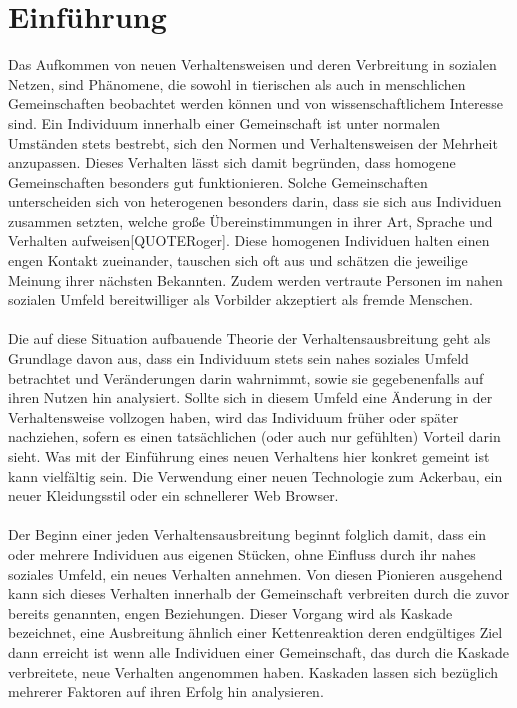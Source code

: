 \documentclass[12pt]{article}
\begin{document}
\section{Einführung}
Das Aufkommen von neuen Verhaltensweisen und deren Verbreitung in sozialen Netzen, sind Phänomene, die sowohl in tierischen als auch in menschlichen Gemeinschaften beobachtet werden können und von wissenschaftlichem Interesse sind. Ein Individuum innerhalb einer Gemeinschaft ist unter normalen Umständen stets bestrebt, sich den Normen und Verhaltensweisen der Mehrheit anzupassen. Dieses Verhalten lässt sich damit begründen, dass homogene Gemeinschaften besonders gut funktionieren. Solche Gemeinschaften unterscheiden sich von heterogenen besonders darin, dass sie sich aus Individuen zusammen setzten, welche große Übereinstimmungen in ihrer Art, Sprache und Verhalten aufweisen[QUOTERoger]. Diese homogenen Individuen halten einen engen Kontakt zueinander, tauschen sich oft aus und schätzen die jeweilige Meinung ihrer nächsten Bekannten. Zudem werden vertraute Personen im nahen sozialen Umfeld bereitwilliger als Vorbilder akzeptiert als fremde Menschen.\\\\
Die auf diese Situation aufbauende Theorie der Verhaltensausbreitung geht als Grundlage davon aus, dass ein Individuum stets sein nahes soziales Umfeld betrachtet und Veränderungen darin wahrnimmt, sowie sie gegebenenfalls auf ihren Nutzen hin analysiert. Sollte sich in diesem Umfeld eine Änderung in der Verhaltensweise vollzogen haben, wird das Individuum früher oder später nachziehen, sofern es einen tatsächlichen (oder auch nur gefühlten) Vorteil darin sieht. Was mit der Einführung eines neuen Verhaltens hier konkret gemeint ist kann vielfältig sein. Die Verwendung einer neuen Technologie zum Ackerbau, ein neuer Kleidungsstil oder ein schnellerer Web Browser.\\\\
Der Beginn einer jeden Verhaltensausbreitung beginnt folglich damit, dass ein oder mehrere Individuen aus eigenen Stücken, ohne Einfluss durch ihr nahes soziales Umfeld, ein neues Verhalten annehmen. Von diesen Pionieren ausgehend kann sich dieses Verhalten innerhalb der Gemeinschaft verbreiten durch die zuvor bereits genannten, engen Beziehungen. Dieser Vorgang wird als Kaskade bezeichnet, eine Ausbreitung ähnlich einer Kettenreaktion deren endgültiges Ziel dann erreicht ist wenn alle Individuen einer Gemeinschaft, das durch die Kaskade verbreitete, neue Verhalten angenommen haben.
Kaskaden lassen sich bezüglich mehrerer Faktoren auf ihren Erfolg hin analysieren.
\end{document}
